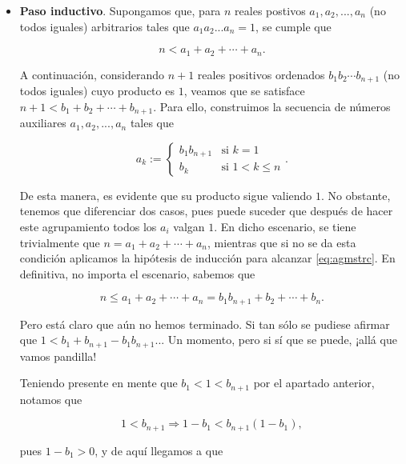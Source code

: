 \documentclass{article}
\begin{document}
\begin{itemize}
\begin{itemize}
        lo cual es siempre cierto bajo las hipótesis impuestas (i.e. $b_1 \neq b_2$). Nótese que, en verdad, lo que hemos probado es que para cualesquiera $x, y \in \mathbb{R}^+$ distintos se tiene que $\sqrt{xy} < (x + y) / 2$.

        \item \textbf{Paso inductivo}. Supongamos que, para $n$ reales postivos $a_1, a_2, ..., a_n$ (no todos iguales) arbitrarios tales que $a_1a_2...a_n = 1$, se cumple que
        
        \begin{equation}
            n < a_1 + a_2 + \cdots + a_n.
            \label{eq:agmstrc}
        \end{equation}

        A continuación, considerando $n + 1$ reales positivos ordenados $b_1b_2 \cdots b_{n+1}$ (no todos iguales) cuyo producto es $1$, veamos que se satisface $n + 1 < b_1 + b_2 + \cdots + b_{n + 1}$. Para ello, construimos la secuencia de números auxiliares $a_1, a_2, ..., a_n$ tales que

        \[
        a_k := 
        \begin{cases}
            b_1b_{n + 1} & \text{si $k = 1$} \\
            b_k & \text{si $1 < k \leq n$}
        \end{cases}
        .\]

        De esta manera, es evidente que su producto sigue valiendo $1$. No obstante, tenemos que diferenciar dos casos, pues puede suceder que después de hacer este
        agrupamiento todos los $a_i$ valgan $1$. En dicho escenario, se tiene trivialmente que $n = a_1 + a_2 + \cdots + a_n$, mientras que si no se da esta condición aplicamos 
        la hipótesis de inducción para alcanzar \eqref{eq:agmstrc}. En definitiva, no importa el escenario, sabemos que

        \[n \leq a_1 + a_2 + \cdots + a_n = b_1b_{n+1} + b_2 + \cdots + b_n.\]

        Pero está claro que aún no hemos terminado. Si tan sólo se pudiese afirmar que $1 < b_1 + b_{n + 1} - b_1b_{n + 1}$... Un momento, pero si sí que se puede, ¡allá que vamos pandilla!

        Teniendo presente en mente que $b_1 < 1 < b_{n + 1}$ por el apartado anterior, notamos que 

        \[1 < b_{n + 1} \Longrightarrow 1 - b_1 < b_{n + 1}(1 - b_1),\]

        pues $1 - b_1 > 0$, y de aquí llegamos a que


\end{itemize}
\end{itemize}
\end{document}
